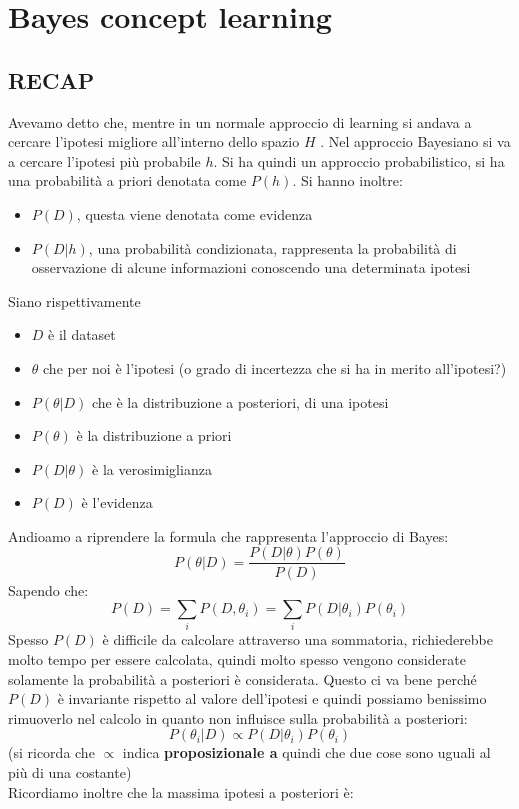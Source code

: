 \section{Bayes concept learning}
\subsection{RECAP}
Avevamo detto che, mentre in un normale approccio di learning si andava a cercare l'ipotesi migliore all'interno dello spazio $H$ . Nel approccio Bayesiano si va a cercare l'ipotesi più probabile $h$. Si ha quindi un approccio probabilistico, si ha una probabilità a priori denotata come $P(h)$. Si hanno inoltre:
\begin{itemize}
    \item $P(D)$, questa viene denotata come evidenza 
    \item $P(D|h)$, una probabilità condizionata, rappresenta la probabilità di osservazione di alcune informazioni conoscendo una determinata ipotesi
\end{itemize}
Siano rispettivamente 
\begin{itemize}
  \item $D$ è il dataset
  \item $\theta$ che per noi è l'ipotesi (o grado di incertezza che si ha in merito all'ipotesi?)
  \item $P(\theta|D)$ che è la distribuzione a posteriori, di una ipotesi 
  \item $P(\theta)$ è la distribuzione a priori
  \item $P(D|\theta)$ è la verosimiglianza
  \item $P(D)$ è l'evidenza
\end{itemize}
Andioamo a riprendere la formula che rappresenta l'approccio di Bayes:
\[P(\theta|D)=\frac{P(D|\theta)P(\theta)}{P(D)}\]
Sapendo che: 
\[P(D)=\sum_i P(D, \theta_i)=\sum_i P(D|\theta_i)P(\theta_i)\]
Spesso $P(D)$ è difficile da calcolare attraverso una sommatoria, richiederebbe molto tempo per essere calcolata, quindi molto spesso vengono considerate solamente la probabilità a posteriori è considerata. Questo ci va bene perché $P(D)$ è invariante rispetto al valore dell'ipotesi e quindi possiamo benissimo rimuoverlo nel calcolo in quanto non influisce sulla probabilità a posteriori:
\[P(\theta_i|D)\varpropto P(D|\theta_i)P(\theta_i)\]
(si ricorda che $\varpropto$ indica \textbf{proposizionale a} quindi che due cose sono uguali al più di una costante)\\ Ricordiamo inoltre che la massima ipotesi a posteriori è:

